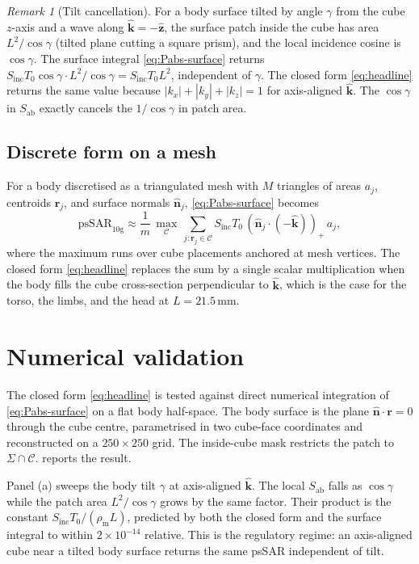 \documentclass[journal,twocolumn,10pt]{IEEEtran}
\theoremstyle{plain}
\theoremstyle{remark}
\newtheorem{remark}[proposition]{Remark}
\newcommand{\khat}{\hat{\bm{k}}}
\newcommand{\nhat}{\hat{\bm{n}}}
\newcommand{\rr}{\mathbf{r}}
\newcommand{\Sinc}{S_{\mathrm{inc}}}
\newcommand{\Sab}{S_{\mathrm{ab}}}
\newcommand{\rhom}{\rho_{\mathrm{m}}}
\newcommand{\pospart}[1]{\left(#1\right)_{+}}
\begin{document}
\begin{remark}[Tilt cancellation]\label{rem:tilt}
For a body surface tilted by angle $\gamma$ from the cube
$z$-axis and a wave along $\khat = -\hat{\mathbf{z}}$, the surface
patch inside the cube has area $L^2/\cos\gamma$ (tilted plane cutting
a square prism), and the local incidence cosine is $\cos\gamma$.
The surface integral \eqref{eq:Pabs-surface} returns
$\Sinc T_0 \cos\gamma \cdot L^2/\cos\gamma = \Sinc T_0 L^2$,
independent of $\gamma$. The closed form
\eqref{eq:headline} returns the same value because
$|k_x|+|k_y|+|k_z| = 1$ for axis-aligned $\khat$. The
$\cos\gamma$ in $\Sab$ exactly cancels the $1/\cos\gamma$ in
patch area.
\end{remark}

\subsection{Discrete form on a mesh}
For a body discretised as a triangulated mesh with $M$ triangles of
areas $a_j$, centroids $\rr_j$, and surface normals $\nhat_j$,
\eqref{eq:Pabs-surface} becomes
\begin{equation}\label{eq:discrete}
  \mathrm{psSAR}_{10\mathrm{g}}
  \approx \frac{1}{m}\, \max_{\mathcal{C}}\,
    \sum_{j:\rr_j \in \mathcal{C}}
    \Sinc T_0\, \pospart{\nhat_j \cdot (-\khat)}\, a_j,
\end{equation}
where the maximum runs over cube placements anchored at mesh
vertices. The closed form \eqref{eq:headline} replaces the sum by a
single scalar multiplication when the body fills the cube
cross-section perpendicular to $\khat$, which is the case for the
torso, the limbs, and the head at $L = 21.5\,$mm.


\section{Numerical validation}\label{sec:val}

The closed form \eqref{eq:headline} is tested against direct
numerical integration of \eqref{eq:Pabs-surface} on a flat body
half-space. The body surface is the plane $\nhat \cdot \rr = 0$
through the cube centre, parametrised in two cube-face coordinates
and reconstructed on a $250 \times 250$ grid. The inside-cube mask
restricts the patch to $\Sigma \cap \mathcal{C}$.
 reports the result.

Panel (a) sweeps the body tilt $\gamma$ at axis-aligned $\khat$.
The local $\Sab$ falls as $\cos\gamma$ while the patch area
$L^2/\cos\gamma$ grows by the same factor. Their product is the
constant $\Sinc T_0 / (\rhom L)$, predicted by both the closed form
and the surface integral to within $2 \times 10^{-14}$ relative.
This is the regulatory regime: an axis-aligned cube near a tilted
body surface returns the same psSAR independent of tilt.
\end{document}
